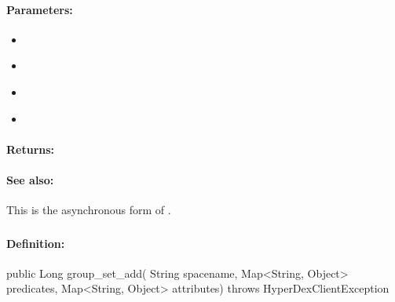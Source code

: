 \paragraph{Parameters:}
\begin{itemize}[noitemsep]
\item {}\\

\item {}\\

\item {}\\

\item {}\\

\end{itemize}

\paragraph{Returns:}


\paragraph{See also:}  This is the asynchronous form of .

\pagebreak
\subsubsection{}
\label{api:java:group_set_add}


\paragraph{Definition:}
\begin{javacode}
public Long group_set_add(
        String spacename,
        Map<String, Object> predicates,
        Map<String, Object> attributes) throws HyperDexClientException
\end{javacode}

